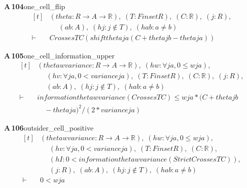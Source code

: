 \documentclass[conference]{IEEEtran}
\theoremstyle{definition}
\newcommand{\lean}[1]{\textsf{\footnotesize #1}}
\begin{document}
\noindent\textbf{A\,104}\quad\lean{one\_cell\_flip}
{\footnotesize\[ \begin{aligned}[t]
&(\mathit{theta} : \mathit{R} \to \mathit{A} \to \mathbb{R} ),\; (\mathit{T} : \mathit{Finset} \mathit{R}),\; (\mathit{C} : \mathbb{R} ),\; (\mathit{j} : \mathit{R}),\\
&\quad \; (\mathit{a} \mathit{b} : \mathit{A}),\; (\mathit{hj} : \mathit{j} \notin \mathit{T}),\; (\mathit{hab} : \mathit{a} \neq \mathit{b})\\
\vdash\;&\mathit{Crosses} \mathit{T} \mathit{C} (\mathit{shift} \mathit{theta} \mathit{j} \mathit{a} (\mathit{C}+\mathit{theta} \mathit{j} \mathit{b}-\mathit{theta} \mathit{j} \mathit{a}))
\end{aligned} \]}

\noindent\textbf{A\,105}\quad\lean{one\_cell\_information\_upper}
{\footnotesize\[ \begin{aligned}[t]
&(\mathit{theta} \mathit{w} \mathit{variance} : \mathit{R} \to \mathit{A} \to \mathbb{R} ),\; (\mathit{hw} : \forall \mathit{j} \mathit{a},0 \leq \mathit{w} \mathit{j} \mathit{a}),\\
&\quad \; (\mathit{hv} : \forall \mathit{j} \mathit{a},0 < \mathit{variance} \mathit{j} \mathit{a}),\; (\mathit{T} : \mathit{Finset} \mathit{R}),\; (\mathit{C} : \mathbb{R} ),\; (\mathit{j} : \mathit{R}),\\
&\quad \; (\mathit{a} \mathit{b} : \mathit{A}),\; (\mathit{hj} : \mathit{j} \notin \mathit{T}),\; (\mathit{hab} : \mathit{a} \neq \mathit{b})\\
\vdash\;&\mathit{information} \mathit{theta} \mathit{w} \mathit{variance} (\mathit{Crosses} \mathit{T} \mathit{C}) \leq \mathit{w} \mathit{j} \mathit{a}*(\mathit{C}+\mathit{theta} \mathit{j} \mathit{b}\\
&\quad -\mathit{theta} \mathit{j} \mathit{a})^{2}/(2*\mathit{variance} \mathit{j} \mathit{a})
\end{aligned} \]}

\noindent\textbf{A\,106}\quad\lean{outsider\_cell\_positive}
{\footnotesize\[ \begin{aligned}[t]
&(\mathit{theta} \mathit{w} \mathit{variance} : \mathit{R} \to \mathit{A} \to \mathbb{R} ),\; (\mathit{hw} : \forall \mathit{j} \mathit{a},0 \leq \mathit{w} \mathit{j} \mathit{a}),\\
&\quad \; (\mathit{hv} : \forall \mathit{j} \mathit{a},0 < \mathit{variance} \mathit{j} \mathit{a}),\; (\mathit{T} : \mathit{Finset} \mathit{R}),\; (\mathit{C} : \mathbb{R} ),\\
&\quad \; (\mathit{hI} : 0 < \mathit{information} \mathit{theta} \mathit{w} \mathit{variance} (\mathit{StrictCrosses} \mathit{T} \mathit{C})),\\
&\quad \; (\mathit{j} : \mathit{R}),\; (\mathit{a} \mathit{b} : \mathit{A}),\; (\mathit{hj} : \mathit{j} \notin \mathit{T}),\; (\mathit{hab} : \mathit{a} \neq \mathit{b})\\
\vdash\;&0 < \mathit{w} \mathit{j} \mathit{a}
\end{aligned} \]}
\end{document}
